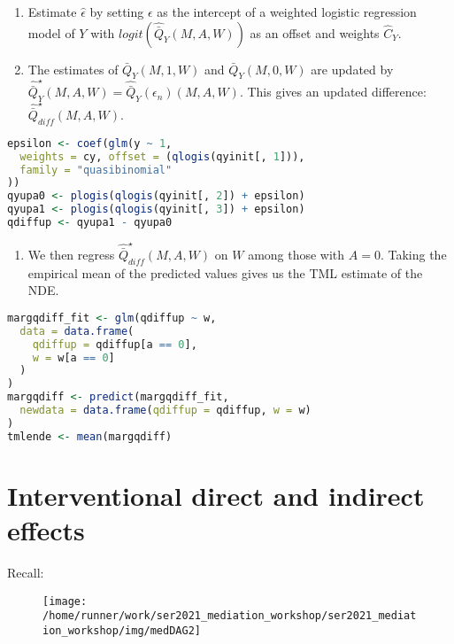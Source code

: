 \documentclass[
  12pt, krantz2,
]{book}
\providecommand{\tightlist}{%
  \setlength{\itemsep}{0pt}\setlength{\parskip}{0pt}}
\theoremstyle{definition}
\theoremstyle{definition}
\theoremstyle{definition}
\newcommand{\1}{\mathbbm{1}}
\begin{document}
\begin{enumerate}
\def\labelenumi{\arabic{enumi}.}
\setcounter{enumi}{3}
\item
  Estimate \(\hat{\epsilon}\) by setting \(\epsilon\) as the intercept of a
  weighted logistic regression model of \(Y\) with
  \(logit(\hat{\bar{Q}}_{Y}(M,A,W))\) as an offset and weights \(\hat{C}_{Y}\).
\item
  The estimates of \(\bar{Q}_{Y}(M,1,W)\) and \(\bar{Q}_{Y}(M,0,W)\) are updated
  by \(\hat{\bar{Q}}^{\star}_{Y}(M,A,W) = \hat{\bar{Q}}_{Y}(\epsilon_n)(M,A,W)\). This gives an updated difference:
  \(\hat{\bar{Q}}^{\star}_{diff}(M,A,W)\).
\end{enumerate}

\begin{lstlisting}[language=R]
epsilon <- coef(glm(y ~ 1,
  weights = cy, offset = (qlogis(qyinit[, 1])),
  family = "quasibinomial"
))
qyupa0 <- plogis(qlogis(qyinit[, 2]) + epsilon)
qyupa1 <- plogis(qlogis(qyinit[, 3]) + epsilon)
qdiffup <- qyupa1 - qyupa0
\end{lstlisting}

\begin{enumerate}
\def\labelenumi{\arabic{enumi}.}
\setcounter{enumi}{5}
\tightlist
\item
  We then regress \(\hat{\bar{Q}}^{\star}_{diff}(M,A,W)\) on \(W\) among those
  with \(A=0\). Taking the empirical mean of the predicted values gives us the
  TML estimate of the NDE.
\end{enumerate}

\begin{lstlisting}[language=R]
margqdiff_fit <- glm(qdiffup ~ w,
  data = data.frame(
    qdiffup = qdiffup[a == 0],
    w = w[a == 0]
  )
)
margqdiff <- predict(margqdiff_fit,
  newdata = data.frame(qdiffup = qdiffup, w = w)
)
tmlende <- mean(margqdiff)
\end{lstlisting}

\hypertarget{interventional-direct-and-indirect-effects}{%
\section{Interventional direct and indirect effects}\label{interventional-direct-and-indirect-effects}}

Recall:

\begin{figure}

{\centering \texttt{[image: /home/runner/work/ser2021\_mediation\_workshop/ser2021\_mediation\_workshop/img/medDAG2]} 

}

\end{figure}
\end{document}
